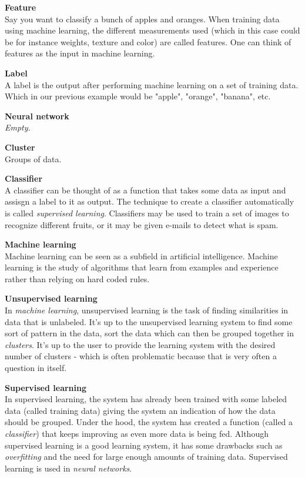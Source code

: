 \textbf{Feature } \\
Say you want to classify a bunch of apples and oranges. When training data using machine learning, the different measurements used (which in this case could be for instance weights, texture and color) are called features. One can think of features as the input in machine learning. 


\textbf{Label } \\
A label is the output after performing machine learning on a set of training data. Which in our previous example would be "apple", "orange", "banana", etc.


\textbf{Neural network} \\
\textit{Empty.}


\textbf{Cluster} \\
Groups of data.


\textbf{Classifier } \\
A classifier can be thought of as a function that takes some data as input and assisgn a label to it as output. The technique to create a classifier automatically is called \textit{supervised learning}. Classifiers may be used to train a set of images to recognize different fruits, or it may be given e-mails to detect what is spam.


\textbf{Machine learning } \\
Machine learning can be seen as a subfield in artificial intelligence. Machine learning is the study of algorithms that learn from examples and experience rather than relying on hard coded rules. 


\textbf{Unsupervised learning} \\
In \textit{machine learning}, unsupervised learning is the task of finding similarities in data that is unlabeled. It's up to the unsupervised learning system to find some sort of pattern in the data, sort the data which can then be grouped together in \textit{clusters}. It's up to the user to provide the learning system with the desired number of clusters - which is often problematic because that is very often a question in itself. 


\textbf{Supervised learning} \\
In supervised learning, the system has already been trained with some labeled data (called training data) giving the system an indication of how the data should be grouped. Under the hood, the system has created a function (called a \textit{classifier}) that keeps improving as even more data is being fed. Although supervised learning is a good learning system, it has some drawbacks such as \textit{overfitting} and the need for large enough amounts of training data. Supervised learning is used in \textit{neural networks}. 


